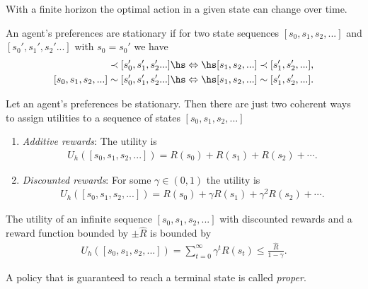 \documentclass{article}
\begin{document}
\begin{theorem}
    With a finite horizon the optimal action in a given state can change over time.
\end{theorem}

\begin{definition}
    An agent's preferences are stationary if for two state sequences
    $[s_0, s_1, s_2, ...]$ and $[s_0', s_1', s_2'...]$ with $s_0=s_0'$ we have
    \begin{align*}
        [s_0, s_1, s_2, ...] \prec [s_0', s_1', s_2'...]\hs&\Leftrightarrow\hs
        [s_1, s_2, ...] \prec [s_1', s_2', ...],\\
        [s_0, s_1, s_2, ...] \sim [s_0', s_1', s_2'...]\hs&\Leftrightarrow\hs
        [s_1, s_2, ...] \sim [s_1', s_2', ...].
    \end{align*}
\end{definition}

\begin{theorem}
    Let an agent's preferences be stationary. Then there are just two coherent
    ways to assign utilities to a sequence of states $[s_0, s_1, s_2, ...]$
    \begin{enumerate}
        \item \emph{Additive rewards}: The utility is \begin{align*}
            U_h([s_0, s_1, s_2, ...]) = R(s_0) + R(s_1) + R(s_2) + \cdots.
        \end{align*}
        \item \emph{Discounted rewards}: For some $\gamma\in(0,1)$ the utility is \begin{align*}
            U_h([s_0, s_1, s_2, ...]) = R(s_0) + \gamma R(s_1) + \gamma^2 R(s_2) + \cdots.
        \end{align*}
    \end{enumerate}
\end{theorem}

\begin{theorem}
    The utility of an infinite sequence $[s_0, s_1, s_2, ...]$ with discounted 
    rewards and a reward function bounded by $\pm \hat R$ is bounded by
    \begin{align*}
        U_h([s_0, s_1, s_2, ...]) = \sum_{t=0}^\infty \gamma^t R(s_t) \leq \frac{\hat R}{1-\gamma}.
    \end{align*}
\end{theorem}

\begin{definition}
    A policy that is guaranteed to reach a terminal state is called \emph{proper}.
\end{definition}
\end{document}
